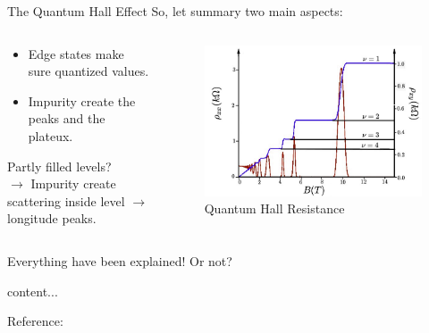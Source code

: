\documentclass{beamer}
\begin{document}
\begin{frame}{The Quantum Hall Effect}
	\quad So, let summary two main aspects:\null\\
	\begin{columns}
		\begin{column}{0.5\textwidth}
\begin{itemize}
\item Edge states make sure quantized values.\\ 
\item Impurity create the peaks and the plateux.\\
\end{itemize}
\quad Partly filled levels?\\
$\rightarrow$ Impurity create scattering inside level $\to$ longitude peaks.
		\end{column}
		\begin{column}{0.5\textwidth}
			\begin{figure}
				\includegraphics[width=0.8\linewidth]{Images/Rhoxy.jpg}
				\caption{Quantum Hall Resistance
					\cite*[Taken from ][]{manchesterAdvancedQuantum}}
			\end{figure}
		\end{column}
	\end{columns}
	\begin{center}
Everything have been explained! Or not?
	\end{center}
\end{frame}
\begin{frame}
	content...
\end{frame}
\begin{frame}
Reference:
\printbibliography
\end{frame}
\end{document}
